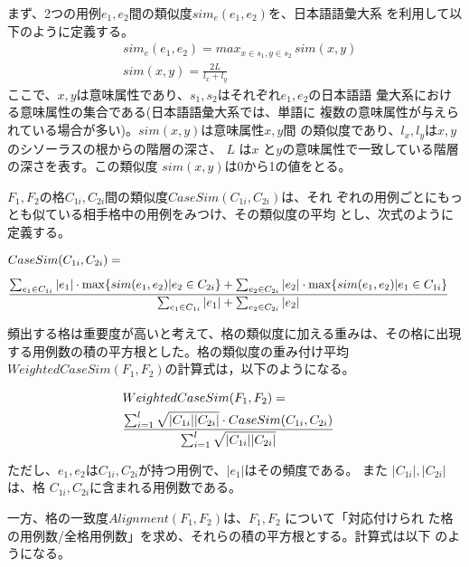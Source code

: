 \documentclass[fleqn]{nlp}
\begin{document}
まず、2つの用例$e_1, e_2$間の類似度$sim_e(e_1, e_2)$を、日本語語彙大系
\cite{NTT}を利用して以下のように定義する。
\begin{eqnarray} \label{Formula::NttSimilarity}
 & sim_e(e_1, e_2) = max_{x \in s_1, y \in s_2} \, sim(x, y) \\[5pt]
 & sim(x, y) = \frac{2L}{l_{x}+l_{y}} \nonumber
\end{eqnarray}
ここで、$x, y$は意味属性であり、$s_1, s_2$はそれぞれ$e_1, e_2$の日本語語
彙大系における意味属性の集合である(日本語語彙大系では、単語に
複数の意味属性が与えられている場合が多い)。$sim(x, y)$は意味属性$x, y$間
の類似度であり、$l_{x}, l_{y}$は$x, y$のシソーラスの根からの階層の深さ、
$L$ は$x$ と$y$の意味属性で一致している階層の深さを表す。この類似度
$sim(x, y)$は0から1の値をとる。

$F_1, F_2$の格$C_{1i}, C_{2i}$間の類似度$CaseSim(C_{1i},C_{2i})$は、それ
ぞれの用例ごとにもっとも似ている相手格中の用例をみつけ、その類似度の平均
とし、次式のように定義する。
 
\begin{eqnarray} \label{Formula::CaseSimilarity}
 \lefteqn{CaseSim(C_{1i},C_{2i}) =} \nonumber \\[5pt]
  & \frac{
  \sum_{e_1 \in C_{1i}}{\displaystyle |e_1| \cdot \max \{ sim(e_1,e_2) | e_2 \in C_{2i} \}} + 
  \sum_{e_2 \in C_{2i}}{\displaystyle |e_2| \cdot \max \{ sim(e_1,e_2) | e_1 \in C_{1i} \}}
  }
  {
  \sum_{e_1 \in C_{1i}}{\displaystyle |e_1|} + \sum_{ e_2 \in C_{2i} }{\displaystyle |e_2|}
  }
\end{eqnarray}
 
頻出する格は重要度が高いと考えて、格の類似度に加える重みは、その格に出現
する用例数の積の平方根とした。格の類似度の重み付け平均 
$WeightedCaseSim(F_1,F_2)$の計算式は，以下のようになる。

\begin{eqnarray}
 \lefteqn{WeightedCaseSim(F_1,F_2)=} \nonumber \\
 & \frac
  {
  \sum_{i=1}^{l} \displaystyle \sqrt{|C_{1i}||C_{2i}|} \cdot CaseSim(C_{1i},C_{2i})
  }
  {
  \sum_{i=1}^{l} \displaystyle \sqrt{|C_{1i}||C_{2i}|}
  }
\end{eqnarray}

ただし、$e_1,e_2$は$C_{1i},C_{2i}$が持つ用例で、$|e_1|$はその頻度である。
また $|C_{1i}|,|C_{2i}|$は、格 $C_{1i},C_{2i}$に含まれる用例数である。

一方、格の一致度$Alignment(F_1,F_2)$は、$F_1,F_2$ について「対応付けられ
た格の用例数/全格用例数」を求め、それらの積の平方根とする。計算式は以下
のようになる。
\end{document}

